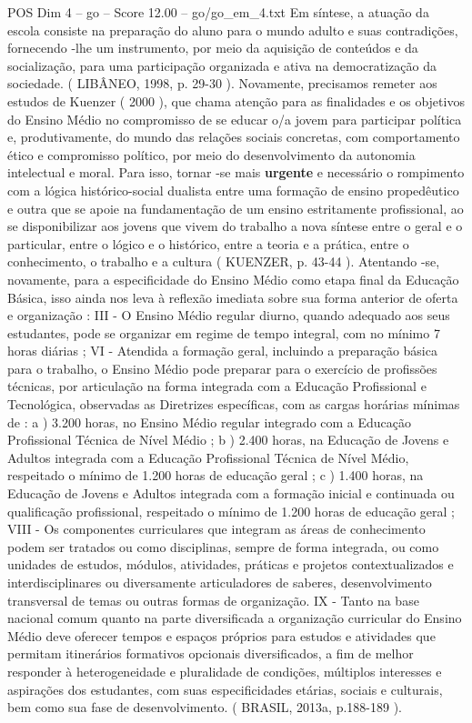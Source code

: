 \begin{textsample}{POS Dim 4 – go – Score 12.00 – go/go\_em\_4.txt}
Em síntese, a atuação da escola consiste na preparação do aluno para o mundo adulto e suas contradições, fornecendo -lhe um instrumento, por meio da aquisição de conteúdos e da socialização, para uma participação organizada e ativa na democratização da sociedade. ( LIBÂNEO, 1998, p. 29-30 ).
Novamente, precisamos remeter aos estudos de Kuenzer ( 2000 ), que chama atenção para as finalidades e os objetivos do Ensino Médio no compromisso de se educar o/a jovem para participar política e, produtivamente, do mundo das relações sociais concretas, com comportamento ético e compromisso político, por meio do desenvolvimento da autonomia intelectual e moral.
Para isso, tornar -se mais \textbf{urgente} e necessário o rompimento com a lógica histórico-social dualista entre uma formação de ensino propedêutico e outra que se apoie na fundamentação de um ensino estritamente profissional, ao se disponibilizar aos jovens que vivem do trabalho a nova síntese entre o geral e o particular, entre o lógico e o histórico, entre a teoria e a prática, entre o conhecimento, o trabalho e a cultura ( KUENZER, p. 43-44 ).
Atentando -se, novamente, para a especificidade do Ensino Médio como etapa final da Educação Básica, isso ainda nos leva à reflexão imediata sobre sua forma anterior de oferta e organização : III - O Ensino Médio regular diurno, quando adequado aos seus estudantes, pode se organizar em regime de tempo integral, com no mínimo 7 horas diárias ; VI - Atendida a formação geral, incluindo a preparação básica para o trabalho, o Ensino Médio pode preparar para o exercício de profissões técnicas, por articulação na forma integrada com a Educação Profissional e Tecnológica, observadas as Diretrizes específicas, com as cargas horárias mínimas de : a ) 3.200 horas, no Ensino Médio regular integrado com a Educação Profissional Técnica de Nível Médio ; b ) 2.400 horas, na Educação de Jovens e Adultos integrada com a Educação Profissional Técnica de Nível Médio, respeitado o mínimo de 1.200 horas de educação geral ; c ) 1.400 horas, na Educação de Jovens e Adultos integrada com a formação inicial e continuada ou qualificação profissional, respeitado o mínimo de 1.200 horas de educação geral ; VIII - Os componentes curriculares que integram as áreas de conhecimento podem ser tratados ou como disciplinas, sempre de forma integrada, ou como unidades de estudos, módulos, atividades, práticas e projetos contextualizados e interdisciplinares ou diversamente articuladores de saberes, desenvolvimento transversal de temas ou outras formas de organização.
IX - Tanto na base nacional comum quanto na parte diversificada a organização curricular do Ensino Médio deve oferecer tempos e espaços próprios para estudos e atividades que permitam itinerários formativos opcionais diversificados, a fim de melhor responder à heterogeneidade e pluralidade de condições, múltiplos interesses e aspirações dos estudantes, com suas especificidades etárias, sociais e culturais, bem como sua fase de desenvolvimento. ( BRASIL, 2013a, p.188-189 ).

\end{textsample}
